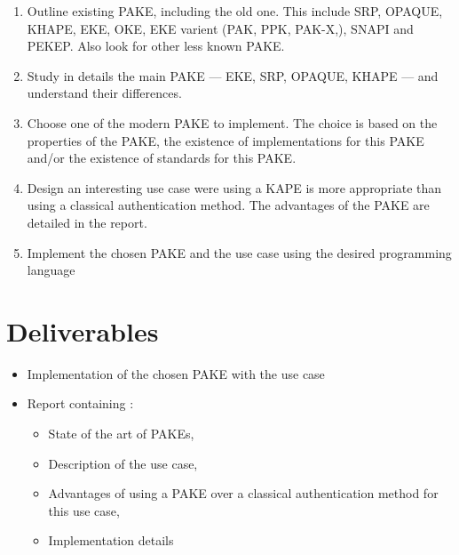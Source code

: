 \documentclass[../report.tex]{subfiles}
\begin{document}
\begin{enumerate}
 \item Outline existing PAKE, including the old one. This include SRP, OPAQUE, KHAPE, EKE, OKE, EKE varient (PAK, PPK, PAK-X,), SNAPI and PEKEP. Also look for other less known PAKE.

 \item Study in details the main PAKE --- EKE, SRP, OPAQUE, KHAPE --- and understand their differences.

 \item Choose one of the modern PAKE to implement. The choice is based on the properties of the PAKE, the existence of implementations for this PAKE and/or the existence of standards for this PAKE.

 \item Design an interesting use case were using a KAPE is more appropriate than using a classical authentication method. The advantages of the PAKE are detailed in the report.

 \item Implement the chosen PAKE and the use case using the desired programming language
\end{enumerate}









\section*{Deliverables}


\begin{itemize}
 \item Implementation of the chosen PAKE with the use case
 \item Report containing :
 \begin{itemize}
    \item State of the art of PAKEs,
    \item Description of the use case,
    \item Advantages of using a PAKE over a classical authentication method for this use case,
    \item Implementation details
 \end{itemize}
\end{itemize}
\end{document}
